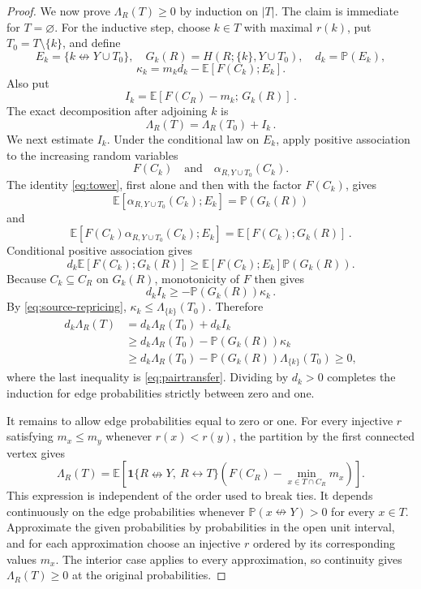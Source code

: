 \documentclass[11pt]{article}
\theoremstyle{definition}
\theoremstyle{remark}
\newcommand{\PP}{\mathbb P}
\newcommand{\EE}{\mathbb E}
\newcommand{\one}{\mathbf 1}
\newcommand{\con}{\leftrightarrow}
\newcommand{\ncon}{\nleftrightarrow}
\begin{document}
\begin{proof}
We now prove $\Lambda_R(T)\geq0$ by induction on $|T|$. The claim is immediate for
$T=\varnothing$. For the inductive step, choose $k\in T$ with maximal $r(k)$, put
$T_0=T\setminus\{k\}$, and define
\[
 E_k=\{k\ncon Y\cup T_0\},\quad
 G_k(R)=H(R;\{k\},Y\cup T_0),\quad d_k=\PP(E_k),
\]
\[
 \kappa_k=m_kd_k-\EE[F(C_k);E_k].
\]
Also put
\[
 I_k=\EE[F(C_R)-m_k;\,G_k(R)]\,.
\]
The exact decomposition after adjoining $k$ is
\begin{equation}\label{eq:source-surplus-split}
 \Lambda_R(T)=\Lambda_R(T_0)+I_k\,.
\end{equation}
We next estimate $I_k$. Under the conditional law on $E_k$, apply positive association
to the increasing random variables
\[
 F(C_k)\quad\text{and}\quad \alpha_{R,Y\cup T_0}(C_k).
\]
The identity
\eqref{eq:tower}, first alone and then with the factor $F(C_k)$, gives
\[
 \EE[\alpha_{R,Y\cup T_0}(C_k);E_k]=\PP(G_k(R))
\]
and
\[
 \EE[F(C_k)\alpha_{R,Y\cup T_0}(C_k);E_k]
   =\EE[F(C_k);G_k(R)]\,.
\]
Conditional positive association gives
\[
 d_k\EE[F(C_k);G_k(R)]
 \geq \EE[F(C_k);E_k]\PP(G_k(R)).
\]
Because $C_k\subseteq C_R$ on $G_k(R)$, monotonicity of $F$ then gives
\begin{equation}\label{eq:source-top-vertex}
 d_k I_k\geq-\PP(G_k(R))\kappa_k\,.
\end{equation}
By \eqref{eq:source-repricing}, $\kappa_k\leq\Lambda_{\{k\}}(T_0)$. Therefore
\[
\begin{aligned}
 d_k\Lambda_R(T)
 &=d_k\Lambda_R(T_0)+d_kI_k\\
 &\geq d_k\Lambda_R(T_0)-\PP(G_k(R))\kappa_k\\
 &\geq d_k\Lambda_R(T_0)
   -\PP(G_k(R))\Lambda_{\{k\}}(T_0)\geq0,
\end{aligned}
\]
where the last inequality is \eqref{eq:pairtransfer}. Dividing by $d_k>0$ completes the
induction for edge probabilities strictly between zero and one.

It remains to allow edge probabilities equal to zero or one. For every injective $r$
satisfying $m_x\leq m_y$ whenever $r(x)<r(y)$, the partition by the first connected
vertex gives
\[
 \Lambda_R(T)=\EE\!\left[
 \one\{R\ncon Y,\ R\con T\}
 \left(F(C_R)-\min_{x\in T\cap C_R}m_x\right)\right].
\]
This expression is independent of the order used to break ties. It depends continuously
on the edge probabilities whenever $\PP(x\ncon Y)>0$ for every $x\in T$. Approximate the
given probabilities by probabilities in the open unit interval, and for each approximation
choose an injective $r$ ordered by its corresponding values $m_x$. The interior case
applies to every approximation, so continuity gives $\Lambda_R(T)\geq0$ at the original
probabilities.
\end{proof}
\end{document}
